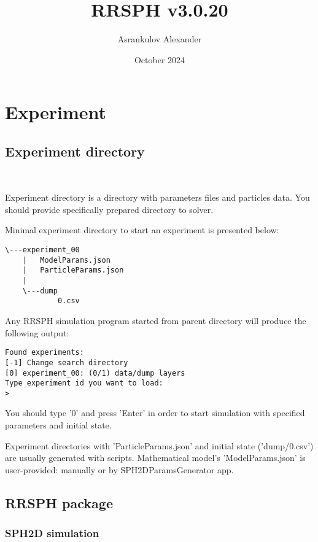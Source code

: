 \documentclass{article}
\title{RRSPH v3.0.20}
\author{Asrankulov Alexander}
\date{October 2024}
\begin{document}
\maketitle

\section{Experiment}

\subsection{Experiment directory}\

Experiment directory is a directory with parameters files and particles data. 
You should provide specifically prepared directory to solver.

Minimal experiment directory to start an experiment is presented below:
\begin{verbatim}
\---experiment_00
    |   ModelParams.json
    |   ParticleParams.json
    |   
    \---dump
            0.csv
\end{verbatim}

Any RRSPH simulation program started from parent directory will produce the following output:
\begin{verbatim}
Found experiments:
[-1] Change search directory
[0] experiment_00: (0/1) data/dump layers
Type experiment id you want to load:
>
\end{verbatim}
You should type '0' and press 'Enter' in order to start simulation with specified parameters and initial state.

Experiment directories with 'ParticleParams.json' and initial state ('dump/0.csv') are usually generated with scripts. Mathematical model's 'ModelParams.json' is user-provided: manually or by SPH2DParamsGenerator app.

\subsection{RRSPH package}

\subsubsection{SPH2D simulation}\
\end{document}
